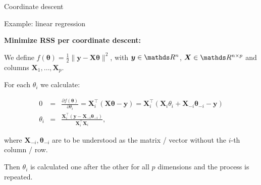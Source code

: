 \documentclass[11pt,compress,t,notes=noshow, xcolor=table]{beamer}
\begin{document}
\begin{vbframe}{Coordinate descent}
%
%



\end{vbframe}

\begin{vbframe}{Example: linear regression}

\textbf{Minimize RSS per coordinate descent:}

We define $f(\bm{\theta}) = \frac{1}{2} \|\bm{y} - \bm{X}\bm{\theta}\|^2$,
with $\bm{y} \in \R^n$, $\bm{X} \in \R^{n \times p}$ and columns $\bm{X}_1, \hdots, \bm{X}_p$.

\lz

For each  $\theta_i$ we calculate:

\begin{footnotesize}
\begin{eqnarray*}
  0 &=& \frac{\partial{f}(\bm{\theta})}{\partial \theta_i}  = \bm{X}_i^{\top} (\bm{X\theta} - \bm{y}) = \bm{X}_i^{\top} (\bm{X}_i \theta_i + \bm{X}_{-i} \bm{\theta}_{-i} - \bm{y}) \\
\theta_i &=& \frac{\bm{X}_i^\top (\bm{y} - \bm{X}_{-i} \bm{\theta}_{-i})}{\bm{X}_i^{\top} \bm{X}_i},
\end{eqnarray*}
\end{footnotesize}

where $\bm{X}_{-i}, \bm{\theta}_{-i}$ are to be understood as the matrix / vector without the $i$-th column / row.

\vspace*{0.2cm}

Then $\theta_i$ is calculated one after the other for all $p$ dimensions and the process is repeated.


\end{vbframe}
\end{document}
